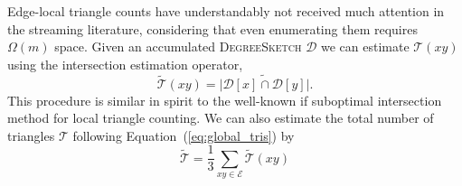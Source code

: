 \documentclass{vldb}
\newcommand{\algoname}[1]{\textnormal{\textsc{#1}}}
\begin{document}
Edge-local triangle counts have understandably not received much attention in the streaming literature, considering that even enumerating them requires $\Omega(m)$ space. 
Given an accumulated \algoname{DegreeSketch} $\mathcal{D}$ we can estimate $\mathcal{T}(xy)$ using the intersection estimation operator,
%
\begin{equation} \label{eq:tri:edge}
	\widetilde{\mathcal{T}}(xy) 
	= \widetilde{|\mathcal{D}[x] \cap \mathcal{D}[y]|}.
\end{equation}
%
This procedure is similar in spirit to the well-known if suboptimal intersection method for local triangle counting. 
We can also estimate the total number of triangles $\mathcal{T}$ following Equation~(\ref{eq:global_tris}) by
%
\begin{equation} \label{eq:tri:total}
	\widetilde{\mathcal{T}} 
	= \frac{1}{3} \sum\limits_{xy \in \mathcal{E}} 	\widetilde{\mathcal{T}}(xy) 
\end{equation}
%
\end{document}
